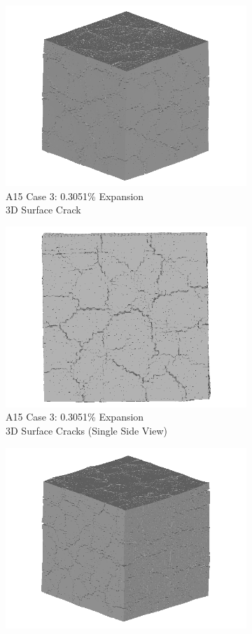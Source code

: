 \begin{figure}[ht!]
\centering

    \begin{subfigure}{.5\textwidth}
      \centering
      \includegraphics[width=.8\linewidth]{Files/exp_3D/ASR/A15P75_3_3d.png}
    \caption{A15 Case 3: 0.3051\% Expansion \\ 3D Surface Crack}
    \end{subfigure}%
    \begin{subfigure}{.5\textwidth}
      \centering
      \includegraphics[width=.8\linewidth]{Files/exp_3D/ASR/A15P75_3_3ds.png}
    \caption{A15 Case 3: 0.3051\% Expansion \\ 3D Surface Cracks (Single Side View)}
    \end{subfigure}
    \begin{subfigure}{.5\textwidth}
      \centering
      \includegraphics[width=.8\linewidth]{Files/exp_3D/ASR/A30P75_3_3d.png}

\end{subfigure}
\end{figure}
